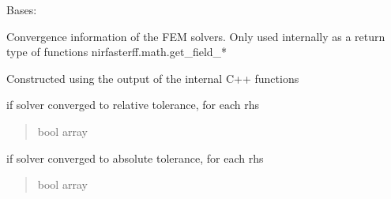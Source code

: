 \documentclass[letterpaper,10pt,english]{sphinxmanual}
\begin{document}
\begin{fulllineitems}
\label{\detokenize{_autosummary/nirfasterff.utils.ConvergenceInfo:nirfasterff.utils.ConvergenceInfo}}
\pysigstartsignatures
\pysiglinewithargsret
{}
{}
{}
\pysigstopsignatures
\sphinxAtStartPar
Bases: 

\sphinxAtStartPar
Convergence information of the FEM solvers. Only used internally as a return type of functions nirfasterff.math.get\_field\_*

\sphinxAtStartPar
Constructed using the output of the internal C++ functions

\begin{fulllineitems}
\label{\detokenize{_autosummary/nirfasterff.utils.ConvergenceInfo:nirfasterff.utils.ConvergenceInfo.isConverged}}
\pysigstartsignatures
\pysigline
{}
\pysigstopsignatures
\sphinxAtStartPar
if solver converged to relative tolerance, for each rhs
\begin{quote}\begin{description}
\sphinxAtStartPar
bool array

\end{description}\end{quote}

\end{fulllineitems}


\begin{fulllineitems}
\label{\detokenize{_autosummary/nirfasterff.utils.ConvergenceInfo:nirfasterff.utils.ConvergenceInfo.isConvergedToAbsoluteTolerance}}
\pysigstartsignatures
\pysigline
{}
\pysigstopsignatures
\sphinxAtStartPar
if solver converged to absolute tolerance, for each rhs
\begin{quote}\begin{description}
\sphinxAtStartPar
bool array


\end{description}
\end{quote}
\end{fulllineitems}
\end{fulllineitems}
\end{document}
